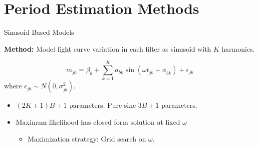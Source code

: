 \documentclass[12pt]{beamer}
\begin{document}





\section{Period Estimation Methods}



\begin{frame}{Sinusoid Based Models}

\textbf{Method:} Model light curve variation in each filter as sinusoid with $K$ harmonics. \cite{mondrik2015multiband,zechmeister2009generalised,lomb1976least,scargle1982studies,schwarzenberg1996fast}

\begin{equation*}
m_{jb} = \beta_b + \sum_{k=1}^K a_{bk}\sin(\omega t_{jb} + \phi_{bk}) + \epsilon_{jb}
\end{equation*}
where $\epsilon_{jb} \sim N(0,\sigma_{jb}^2)$.

\begin{itemize}
\item $(2K + 1)B + 1$ parameters. Pure sine $3B + 1$ parameters.
\item Maximum likelihood has closed form solution at fixed $\omega$
\begin{itemize}
\item Maximization strategy: Grid search on $\omega$.
\end{itemize}
\end{itemize}

\end{frame}
\end{document}
